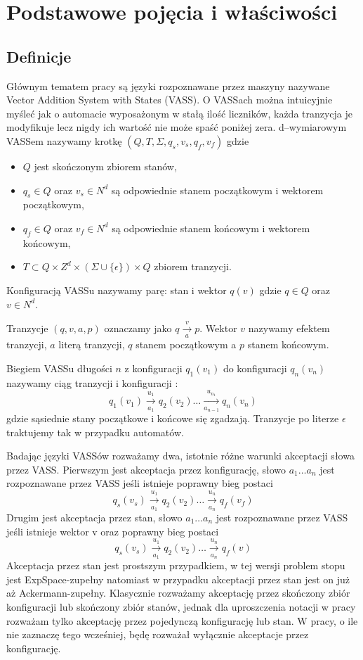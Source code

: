 \documentclass[magisterska]{pracamgr}
\begin{document}
    \chapter{Podstawowe pojęcia i właściwości}\label{r:pojecia}


    \section{Definicje}
    Głównym tematem pracy są języki rozpoznawane przez maszyny nazywane Vector Addition System with States (VASS).
    O VASSach można intuicyjnie myśleć jak o automacie wyposażonym w stałą ilość liczników, każda tranzycja je modyfikuje
    lecz nigdy ich wartość nie może spaść poniżej zera.
    d--wymiarowym VASSem nazywamy krotkę $(Q,T,\Sigma,q_s,v_s,q_f,v_f)$ gdzie
    \begin{itemize}
        \item     $Q$ jest skończonym zbiorem stanów,
        \item     $q_s \in Q$ oraz $v_s \in N^d$ są odpowiednie stanem początkowym i wektorem początkowym,
        \item     $q_f \in Q$ oraz $v_f \in N^d$ są odpowiednie stanem końcowym i wektorem końcowym,
        \item      $T \subset Q \times Z^d \times ( \Sigma \cup \{\epsilon\}) \times Q$ zbiorem tranzycji.
    \end{itemize}
    Konfiguracją VASSu nazywamy parę: stan i wektor $q(v)$ gdzie $q \in Q$ oraz  $v \in N^d$.


    Tranzycje $(q,v,a,p)$ oznaczamy jako $q \xrightarrow[a]{v} p $.
    Wektor $v$ nazywamy efektem tranzycji, $a$ literą tranzycji, $q$ stanem początkowym a $p$ stanem końcowym.


    Biegiem VASSu długości $n$ z konfiguracji $q_1(v_1)$ do konfiguracji $q_n(v_n)$ nazywamy ciąg tranzycji i konfiguracji :
    \[q_1(v_1) \xrightarrow[a_1]{u_1} q_2(v_2) \dots \xrightarrow[a_{n-1}]{u_{n_1}} q_n(v_n) \] gdzie
    sąsiednie stany początkowe i końcowe się zgadzają.
    Tranzycje po literze $\epsilon$ traktujemy tak w przypadku automatów.

    Badając języki VASSów rozważamy dwa, istotnie różne warunki akceptacji słowa przez VASS.
    Pierwszym jest akceptacja przez konfigurację,
    słowo $a_1 \dots a_n$ jest rozpoznawane przez VASS jeśli istnieje poprawny bieg postaci
    \[q_s(v_s) \xrightarrow[a_1]{u_1} q_2(v_2) \dots \xrightarrow[a_{n}]{u_{n}} q_f(v_f) \]
    Drugim jest akceptacja przez stan,
    słowo $a_1 \dots a_n$ jest rozpoznawane przez VASS jeśli istnieje wektor v oraz poprawny bieg postaci
    \[q_s(v_s) \xrightarrow[a_1]{u_1} q_2(v_2) \dots \xrightarrow[a_{n}]{u_{n}} q_f(v) \]
    Akceptacja przez stan jest prostszym przypadkiem, w tej wersji problem stopu jest ExpSpace-zupełny \cite{Rackoff} natomiast w przypadku
    akceptacji przez stan jest on już aż Ackermann-zupełny.
    Klasycznie rozważamy akceptację przez skończony zbiór konfiguracji lub skończony zbiór stanów, jednak dla uproszczenia notacji w pracy
    rozważam tylko akceptację przez pojedynczą konfigurację lub stan.
    W pracy, o ile nie zaznaczę tego wcześniej, będę rozważał wyłącznie akceptacje przez konfigurację.
\end{document}
